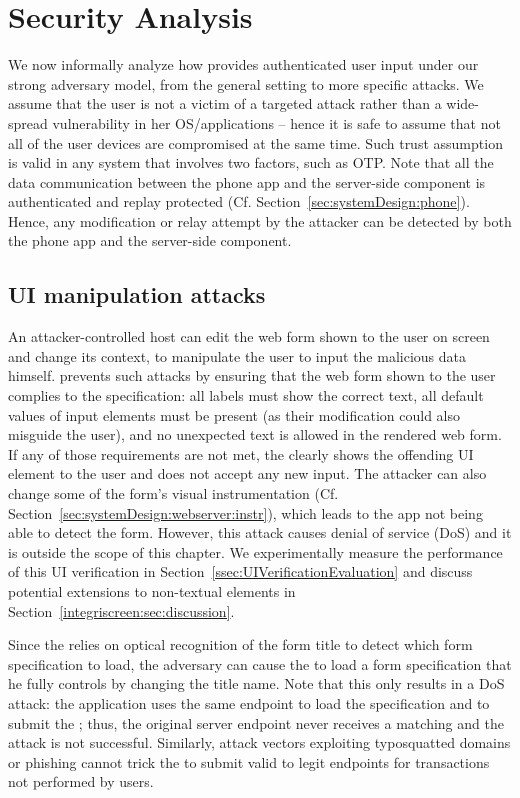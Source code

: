 \section{Security Analysis} 
\label{integriscreen:sec:securityAnalysis}


We now informally analyze how \sysname provides authenticated user input under our strong adversary model, from the general setting to more specific attacks.
We assume that the user is not a victim of a targeted attack rather than a wide-spread vulnerability in her OS/applications -- hence it is safe to assume that not all of the user devices are compromised at the same time. Such trust assumption is valid in any system that involves two factors, such as OTP. Note that all the data communication between the \sysname phone app and the server-side component is authenticated and replay protected (Cf. Section~\ref{sec:systemDesign:phone}). Hence, any modification or relay attempt by the attacker can be detected by both the phone app and the server-side component.


\subsection{UI manipulation attacks}

An attacker-controlled host can edit the web form shown to the user on screen and change its context, to manipulate the user to input the malicious data himself. \name prevents such attacks by ensuring that the web form shown to the user complies to the specification: all labels must show the correct text, all default values of input elements must be present (as their modification could also misguide the user), and no unexpected text is allowed in the rendered web form. If any of those requirements are not met, the \app clearly shows the offending UI element to the user and does not accept any new input. The attacker can also change some of the form's visual instrumentation (Cf. Section~\ref{sec:systemDesign:webserver:instr}), which leads to the \sysname app not being able to detect the form. However, this attack causes denial of service (DoS) and it is outside the scope of this chapter.
We experimentally measure the performance of this UI verification in Section~\ref{ssec:UIVerificationEvaluation} and discuss potential extensions to non-textual elements in Section~\ref{integriscreen:sec:discussion}.


Since the \app relies on optical recognition of the form title to detect which form specification to load, the adversary can cause the \app to load a form specification that he fully controls by changing the title name.
Note that this only results in a DoS attack: the application uses the same endpoint to load the specification and to submit the \POI; thus, the original server endpoint never receives a matching \POI and the attack is not successful.
Similarly, attack vectors exploiting typosquatted domains or phishing cannot trick the \app to submit valid \PsOI to legit endpoints for transactions not performed by users.


